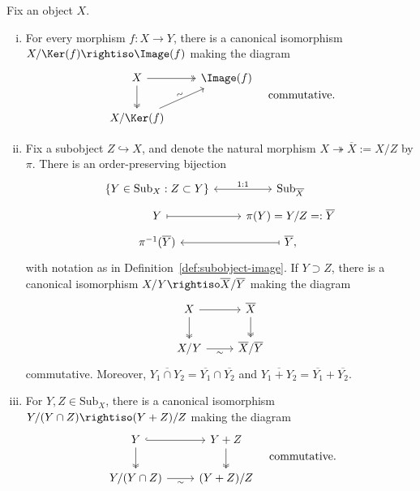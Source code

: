 \begin{theorem}\label{prop:Abel-cat-isom-thm}
	Fix an object $X$.
	\begin{enumerate}[(i)]
		\item For every morphism $f:X\to Y$, there is a canonical isomorphism
		$X/\Ker(f)\rightiso\Image(f)$ making the diagram
		\[\begin{tikzcd}
			X \arrow[twoheadrightarrow, r] \arrow[twoheadrightarrow, d] & \Image(f) \\
			X/\Ker(f) \arrow[ru, "\sim" sloped]
		\end{tikzcd} \quad \text{commutative}. \]
		\item Fix a subobject $Z\hookrightarrow X$, and denote the natural
		morphism $X\twoheadrightarrow\overline{X}:=X/Z$ by $\pi$. There is an
		order-preserving bijection
		\[\begin{tikzcd}[row sep=tiny]
			\left\{ Y \in \mathrm{Sub}_X : Z \subset Y \right\} \arrow[leftrightarrow, r, "1:1"] & \mathrm{Sub}_{\overline{X}} \\
			Y \arrow[r, mapsto] & \pi(Y) = Y/Z =: \overline{Y} \\
			\pi^{-1}(\overline{Y}) & \overline{Y} \arrow[mapsto, l] ,
		\end{tikzcd}\]
		with notation as in Definition~\ref{def:subobject-image}. If
		$Y\supset Z$, there is a canonical isomorphism
		$X/Y\rightiso\overline{X}/\overline{Y}$ making the diagram
		\[\begin{tikzcd}
			X \arrow[r] \arrow[twoheadrightarrow, d] & \overline{X} \arrow[twoheadrightarrow, d] \\
			X/Y \arrow[r, "\sim"'] & \overline{X}/\overline{Y}
		\end{tikzcd}\]
		commutative. Moreover,
		$\overline{Y_1\cap Y_2}=\overline{Y_1}\cap\overline{Y_2}$ and
		$\overline{Y_1+Y_2}=\overline{Y_1}+\overline{Y_2}$.
		\item For $Y,Z\in\mathrm{Sub}_X$, there is a canonical isomorphism
		$Y/(Y\cap Z)\rightiso(Y+Z)/Z$ making the diagram
		\[\begin{tikzcd}
			Y \arrow[hookrightarrow, r] \arrow[twoheadrightarrow, d] & Y+Z \arrow[twoheadrightarrow, d] \\
			Y/(Y \cap Z) \arrow[r, "\sim"'] & (Y+Z)/Z
		\end{tikzcd} \quad \text{commutative}. \]
	\end{enumerate}
\end{theorem}
